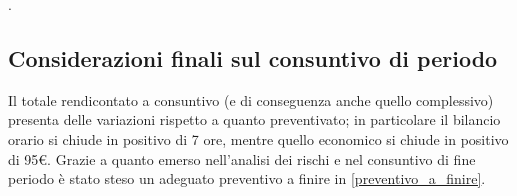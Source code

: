 .
	\subsection{Considerazioni finali sul consuntivo di periodo}
	\label{consid_cons_pl}
	Il totale rendicontato a consuntivo (e di conseguenza anche quello complessivo) presenta delle variazioni rispetto a quanto preventivato; in particolare il bilancio orario si chiude in positivo di 7 ore, mentre quello economico si chiude in positivo di 95€. Grazie a quanto emerso nell'analisi dei rischi e nel consuntivo di fine periodo è stato steso un adeguato preventivo a finire in  \ref{preventivo_a_finire}.